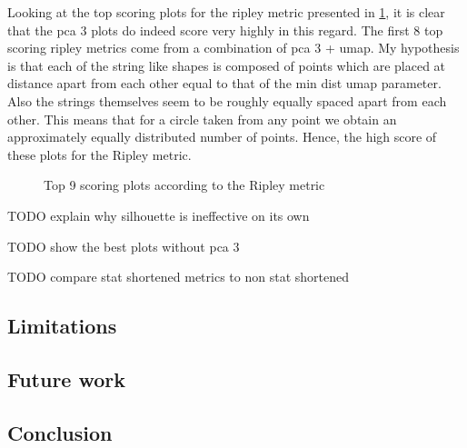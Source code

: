\documentclass[11pt]{article}
\begin{document}
Looking at the top scoring plots for the ripley metric presented in \ref{fig:top_ripley}, it is clear that the pca 3 plots do indeed score very highly in this regard. The first 8 top scoring ripley metrics come from a combination of pca 3 + umap. My hypothesis is that each of the string like shapes is composed of points which are placed at distance apart from each other equal to that of the min dist umap parameter. Also the strings themselves seem to be roughly equally spaced apart from each other. This means that for a circle taken from any point we obtain an approximately equally distributed number of points. Hence, the high score of these plots for the Ripley metric.

\begin{figure}[htbp]
\centering
{}
\caption{Top 9 scoring plots according to the Ripley metric}
\label{fig:top_ripley}
\end{figure}

TODO explain why silhouette is ineffective on its own

TODO show the best plots without pca 3

TODO compare stat shortened metrics to non stat shortened

\subsection{Limitations}
\label{sec:org1e550a7}
\subsection{Future work}
\label{sec:org1054556}
\subsection{Conclusion}
\label{sec:orgf2b4e9e}



\end{document}
